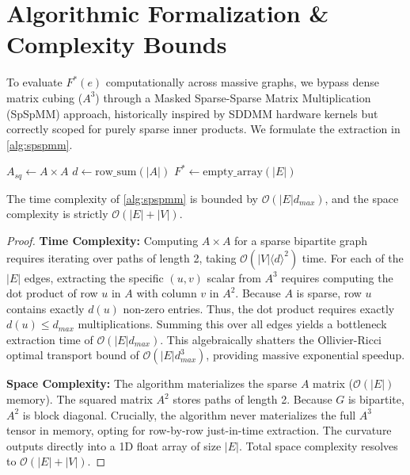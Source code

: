 \documentclass{siuro250211}
\begin{document}
\section{Algorithmic Formalization \& Complexity Bounds}

To evaluate $F^*(e)$ computationally across massive graphs, we bypass dense matrix cubing ($A^3$) through a Masked Sparse-Sparse Matrix Multiplication (SpSpMM) approach, historically inspired by SDDMM hardware kernels but correctly scoped for purely sparse inner products. We formulate the extraction in \cref{alg:spspmm}.

\begin{algorithm2e}[htbp]
\caption{Sparse $C_4$ Bipartite Edge Extraction via SpSpMM}
\label{alg:spspmm}
\SetAlgoLined
{}
$A_{sq} \gets A \times A$ 
$d \gets \text{row\_sum}(|A|)$\;
$F^* \gets \text{empty\_array}(|E|)$\;
\end{algorithm2e}

\begin{theorem}
\label{thm:complexity}
The time complexity of \cref{alg:spspmm} is bounded by $\mathcal{O}(|E| d_{max})$, and the space complexity is strictly $\mathcal{O}(|E| + |V|)$.
\end{theorem}

\begin{proof}
\textbf{Time Complexity:} Computing $A \times A$ for a sparse bipartite graph requires iterating over paths of length 2, taking $\mathcal{O}(|V| \langle d \rangle^2)$ time. For each of the $|E|$ edges, extracting the specific $(u,v)$ scalar from $A^3$ requires computing the dot product of row $u$ in $A$ with column $v$ in $A^2$. Because $A$ is sparse, row $u$ contains exactly $d(u)$ non-zero entries. Thus, the dot product requires exactly $d(u) \le d_{max}$ multiplications. Summing this over all edges yields a bottleneck extraction time of $\mathcal{O}(|E| d_{max})$. This algebraically shatters the Ollivier-Ricci optimal transport bound of $\mathcal{O}(|E| d_{max}^3)$, providing massive exponential speedup. 

\textbf{Space Complexity:} The algorithm materializes the sparse $A$ matrix ($\mathcal{O}(|E|)$ memory). The squared matrix $A^2$ stores paths of length 2. Because $G$ is bipartite, $A^2$ is block diagonal. Crucially, the algorithm never materializes the full $A^3$ tensor in memory, opting for row-by-row just-in-time extraction. The curvature outputs directly into a 1D float array of size $|E|$. Total space complexity resolves to $\mathcal{O}(|E| + |V|)$.
\end{proof}
\end{document}

